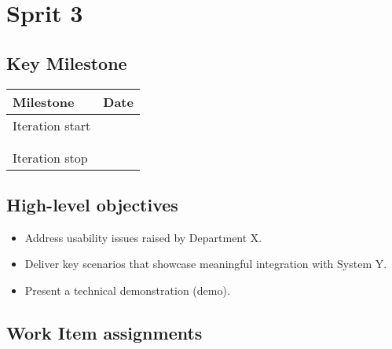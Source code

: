 \clearpage
\section{Sprit 3}

\subsection*{Key Milestone}


\noindent\begin{tabular}{|l|l|}
\hline
Milestone       & Date \\ \hline
Iteration start &      \\ \hline
                &      \\ \hline
                &      \\ \hline
Iteration stop  &      \\ \hline
\end{tabular}

\subsection*{High-level objectives}

\begin{itemize}
	\item Address usability issues raised by Department X.
	\item	Deliver key scenarios that showcase meaningful integration with System Y.
	\item	Present a technical demonstration (demo).
\end{itemize}

\subsection*{Work Item assignments}


